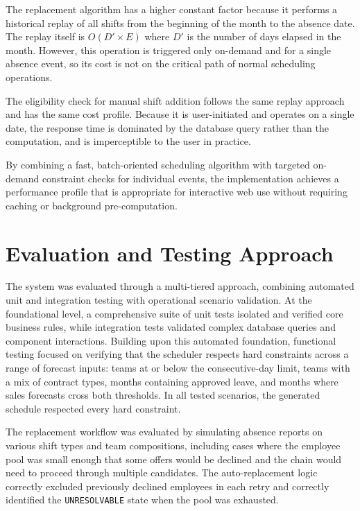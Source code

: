 \par The replacement algorithm has a higher constant factor because it performs a historical replay of all shifts from the beginning of the month to the absence date. The replay itself is $O(D' \times E)$ where $D'$ is the number of days elapsed in the month. However, this operation is triggered only on-demand and for a single absence event, so its cost is not on the critical path of normal scheduling operations.

\par The eligibility check for manual shift addition follows the same replay approach and has the same cost profile. Because it is user-initiated and operates on a single date, the response time is dominated by the database query rather than the computation, and is imperceptible to the user in practice.

\par By combining a fast, batch-oriented scheduling algorithm with targeted on-demand constraint checks for individual events, the implementation achieves a performance profile that is appropriate for interactive web use without requiring caching or background pre-computation.

\section{Evaluation and Testing Approach}
\label{sec:evaluation_and_testing_approach}

\par The system was evaluated through a multi-tiered approach, combining automated unit and integration testing with operational scenario validation. At the foundational level, a comprehensive suite of unit tests isolated and verified core business rules, while integration tests validated complex database queries and component interactions. Building upon this automated foundation, functional testing focused on verifying that the scheduler respects hard constraints across a range of forecast inputs: teams at or below the consecutive-day limit, teams with a mix of contract types, months containing approved leave, and months where sales forecasts cross both thresholds. In all tested scenarios, the generated schedule respected every hard constraint.

\par The replacement workflow was evaluated by simulating absence reports on various shift types and team compositions, including cases where the employee pool was small enough that some offers would be declined and the chain would need to proceed through multiple candidates. The auto-replacement logic correctly excluded previously declined employees in each retry and correctly identified the \texttt{UNRESOLVABLE} state when the pool was exhausted.

